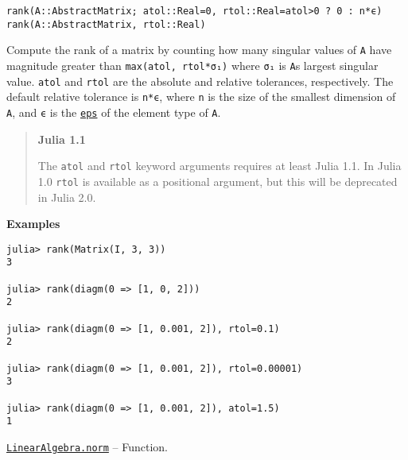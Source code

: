 \begin{adjustwidth}{2em}{0pt}


\begin{verbatim}
rank(A::AbstractMatrix; atol::Real=0, rtol::Real=atol>0 ? 0 : n*ϵ)
rank(A::AbstractMatrix, rtol::Real)
\end{verbatim}

Compute the rank of a matrix by counting how many singular values of \texttt{A} have magnitude greater than \texttt{max(atol, rtol*σ₁)} where \texttt{σ₁} is \texttt{A}{\textquotesingle}s largest singular value. \texttt{atol} and \texttt{rtol} are the absolute and relative tolerances, respectively. The default relative tolerance is \texttt{n*ϵ}, where \texttt{n} is the size of the smallest dimension of \texttt{A}, and \texttt{ϵ} is the \hyperlink{4594213520310841636}{\texttt{eps}} of the element type of \texttt{A}.

\begin{quote}
\textbf{Julia 1.1}

The \texttt{atol} and \texttt{rtol} keyword arguments requires at least Julia 1.1. In Julia 1.0 \texttt{rtol} is available as a positional argument, but this will be deprecated in Julia 2.0.

\end{quote}
\textbf{Examples}


\begin{verbatim}
julia> rank(Matrix(I, 3, 3))
3

julia> rank(diagm(0 => [1, 0, 2]))
2

julia> rank(diagm(0 => [1, 0.001, 2]), rtol=0.1)
2

julia> rank(diagm(0 => [1, 0.001, 2]), rtol=0.00001)
3

julia> rank(diagm(0 => [1, 0.001, 2]), atol=1.5)
1
\end{verbatim}



\end{adjustwidth}
\hypertarget{898926013064269707}{} 
\hyperlink{898926013064269707}{\texttt{LinearAlgebra.norm}}  -- {Function.}

